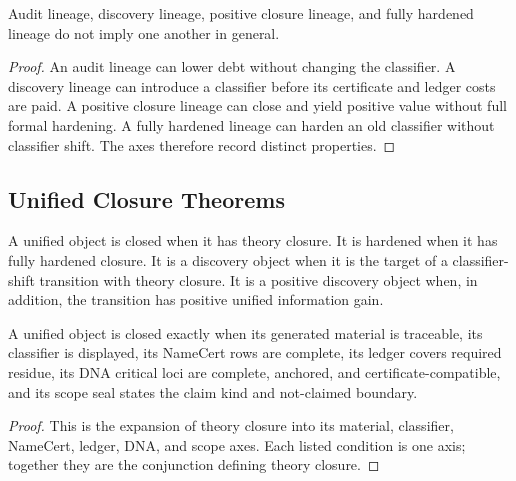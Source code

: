 \begin{theorem}
\label{thm:philosophy-lineage-axes-separate}
Audit lineage, discovery lineage, positive closure lineage, and fully
hardened lineage do not imply one another in general.
\end{theorem}
\begin{proof}
An audit lineage can lower debt without changing the classifier. A
discovery lineage can introduce a classifier before its certificate and
ledger costs are paid. A positive closure lineage can close and yield
positive value without full formal hardening. A fully hardened lineage
can harden an old classifier without classifier shift. The axes therefore
record distinct properties.
\end{proof}

\subsection{Unified Closure Theorems}
\label{subsec:philosophy-unified-closure-theorems}

\begin{definition}
\label{def:philosophy-unified-closed-hardened-discovery-objects}
A unified object is closed when it has theory closure. It is hardened
when it has fully hardened closure. It is a discovery object when it is
the target of a classifier-shift transition with theory closure. It is a
positive discovery object when, in addition, the transition has positive
unified information gain.
\end{definition}

\begin{theorem}
\label{thm:philosophy-unified-closure-theorem}
A unified object is closed exactly when its generated material is
traceable, its classifier is displayed, its NameCert rows are complete,
its ledger covers required residue, its DNA critical loci are complete,
anchored, and certificate-compatible, and its scope seal states the claim
kind and not-claimed boundary.
\end{theorem}
\begin{proof}
This is the expansion of theory closure into its material, classifier,
NameCert, ledger, DNA, and scope axes. Each listed condition is one axis;
together they are the conjunction defining theory closure.
\end{proof}

